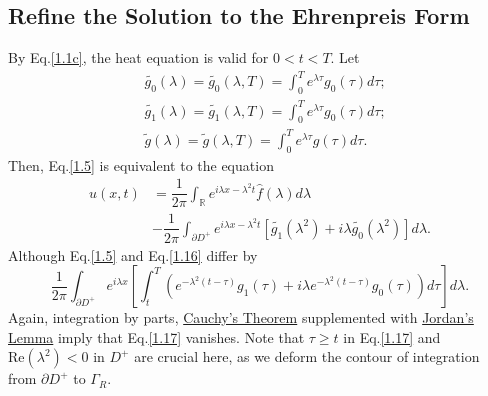 \documentclass[12pt]{article}
\numberwithin{equation}{section}
\begin{document}
\subsection{Refine the Solution to the Ehrenpreis Form}\label{SSec 1.4}
By Eq.\eqref{1.1c}, the heat equation is valid for $0<t<T$. Let
\begin{equation}\label{1.15}
    \begin{split}
    &\tilde{g_0}(\lambda)=\tilde{g_0}(\lambda,T)=\int_{0}^{T} e^{\lambda \tau}g_{0}(\tau) d\tau;\\
    &\tilde{g_1}(\lambda)=\tilde{g_1}(\lambda,T)=\int_{0}^{T} e^{\lambda \tau}g_{0}(\tau) d\tau;\\
    &\tilde{g}(\lambda)=\tilde{g}(\lambda,T)=\int_{0}^{T} e^{\lambda \tau} g(\tau) d\tau.
    \end{split}
\end{equation}
Then, Eq.\eqref{1.5} is equivalent to the equation
\begin{equation}\label{1.16}
    \begin{split}
        u(x,t)&=\dfrac{1}{2\pi}\int_{\mathbb{R}}e^{i\lambda x-\lambda^2 t}\hat{f}(\lambda)d\lambda\\
        &-\dfrac{1}{2\pi}\int_{\partial D^+}e^{i\lambda x-\lambda^2 t}[\tilde{g_1}(\lambda^2)+i\lambda \tilde{g_0}(\lambda^2)]d\lambda.
    \end{split}
\end{equation}
Although Eq.\eqref{1.5} and Eq.\eqref{1.16} differ by
\begin{equation}\label{1.17}
    \dfrac{1}{2\pi}\int_{\partial D^+} e^{i\lambda x}\left[ \int_{t}^{T} \left(e^{-\lambda^2(t-\tau)}g_1(\tau)+i\lambda e^{-\lambda^2(t-\tau)}g_0(\tau)\right)d\tau \right]d\lambda.
\end{equation}
Again, integration by parts, \href{https://w.wiki/9aTM}{Cauchy's Theorem} supplemented with \href{https://w.wiki/9aSw}{Jordan's Lemma} imply that Eq.\eqref{1.17} vanishes. Note that $\tau\geqslant t$ in Eq.\eqref{1.17} and $\text{Re}(\lambda^2)<0$ in $D^+$ are crucial here, as we deform the contour of integration from $\partial D^+$ to $\Gamma_{R}$.
\end{document}

